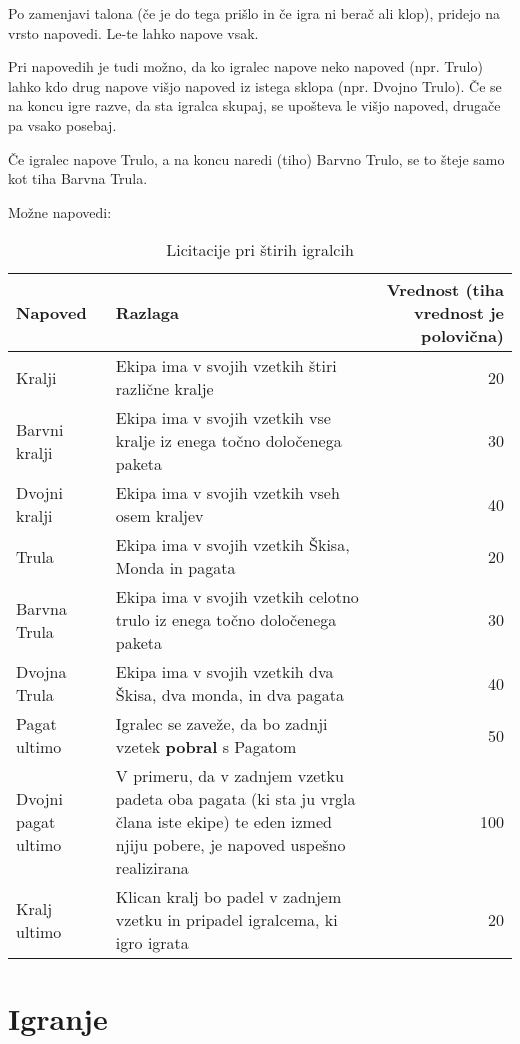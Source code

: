 \documentclass[a4paper, ]{report}
\begin{document}
Po zamenjavi talona (če je do tega prišlo in če igra ni berač ali klop), pridejo na vrsto napovedi. Le-te lahko napove vsak.

Pri napovedih je tudi možno, da ko igralec napove neko napoved (npr. Trulo) lahko kdo drug napove višjo napoved iz istega sklopa (npr. Dvojno Trulo). Če se na koncu igre razve, da sta igralca skupaj, se upošteva le višjo napoved, drugače pa vsako posebaj.

Če igralec napove Trulo, a na koncu naredi (tiho) Barvno Trulo, se to šteje samo kot tiha Barvna Trula.

Možne napovedi:
\begin{table}
  \caption{Licitacije pri štirih igralcih}
  \begin{tabularx}{\textwidth}{lXr{5cm}}
    \hline \hline
    \textbf{Napoved} & \textbf{Razlaga} & \textbf{Vrednost} (tiha vrednost je polovična) \\ \hline \hline
    Kralji & Ekipa ima v svojih vzetkih štiri različne kralje & 20 \\
    Barvni kralji & Ekipa ima v svojih vzetkih vse kralje iz enega točno določenega paketa & 30 \\ %
    Dvojni kralji & Ekipa ima v svojih vzetkih vseh osem kraljev & 40 \\ \hline
    Trula & Ekipa ima v svojih vzetkih Škisa, Monda in pagata & 20 \\
    Barvna Trula & Ekipa ima v svojih vzetkih celotno trulo iz enega točno določenega paketa & 30 \\ %
    Dvojna Trula & Ekipa ima v svojih vzetkih dva Škisa, dva monda, in dva pagata & 40 \\ \hline
    Pagat ultimo & Igralec se zaveže, da bo zadnji vzetek \textbf{pobral} s Pagatom & 50 \\
    Dvojni pagat ultimo & V primeru, da v zadnjem vzetku padeta oba pagata (ki sta ju vrgla člana iste ekipe) te eden izmed njiju pobere, je napoved uspešno realizirana & 100 \\ \hline
    Kralj ultimo & Klican kralj bo padel v zadnjem vzetku in pripadel igralcema, ki igro igrata & 20 \\
    \hline \hline
  \end{tabularx}
\end{table}

\chapter{Igranje}
\end{document}
